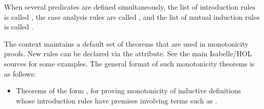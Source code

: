 \begin{isabellebody}
\begin{isamarkuptext}
\begin{description}
  \end{description}

  When several predicates  are
  defined simultaneously, the list of introduction rules is called
  , the case analysis rules are
  called , and the list
  of mutual induction rules is called .%
\end{isamarkuptext}%
\isamarkuptrue%
%
\isamarkuptrue%
%
\begin{isamarkuptext}%
The context maintains a default set of theorems that are used
  in monotonicity proofs.  New rules can be declared via the
  \hyperlink{attribute.HOL.mono}{\mbox{}} attribute.  See the main Isabelle/HOL
  sources for some examples.  The general format of such monotonicity
  theorems is as follows:

  \begin{itemize}

  \item Theorems of the form , for proving
  monotonicity of inductive definitions whose introduction rules have
  premises involving terms such as .


\end{itemize}
\end{isamarkuptext}
\end{isabellebody}
